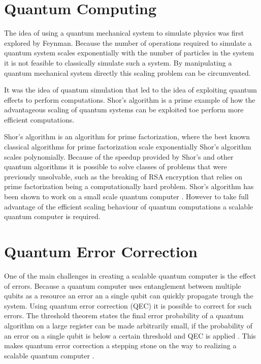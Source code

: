 \section{Quantum Computing}
The idea of using a quantum mechanical system to simulate physics was first explored by Feynman\cite{Feynman1982Simulating}.
Because the number of operations required to simulate a quantum system scales exponentially with the number of particles in the system it is not feasible to classically simulate such a system.
By manipulating a quantum mechanical system directly this scaling problem can be circumvented.

It was the idea of quantum simulation that led to the idea of exploiting quantum effects to perform computations.
Shor's algorithm \citep{Shor1994Algorithms} is a prime example of how the advantageous scaling of quantum systems can be exploited toe perform more efficient computations.

Shor's algorithm is an algorithm for prime factorization, where the best known classical algorithms for prime factorization scale exponentially Shor's algorithm scales polynomially.
Because of  the speedup provided by Shor's and other quantum algorithms it is possible to solve classes of problems that were previously unsolvable, such as the breaking of RSA encryption that relies on prime factorization being a computationally hard problem.
Shor's algorithm has been shown to work on a small scale quantum computer \cite{Vandersypen2001Experimental}.
However to take full advantage of the efficient scaling behaviour of quantum computations a scalable quantum computer is required.

\section{Quantum Error Correction}
One of the main challenges in creating a scalable quantum computer is the effect of errors.
Because a quantum computer uses entanglement between multiple qubits as a resource an error an a single qubit can quickly propagate trough the system.
Using quantum error correction (QEC) it is possible to correct for such errors.
The threshold theorem states the final error probability of a quantum algorithm on a large register can be made arbitrarily small, if the probability of an error on a single qubit is below a certain threshold and QEC is applied \citep{Mermin1990Extreme}.
This makes quantum error correction a stepping stone on the way to realizing a scalable quantum computer \citep{Nielsen2010Quantum}.

